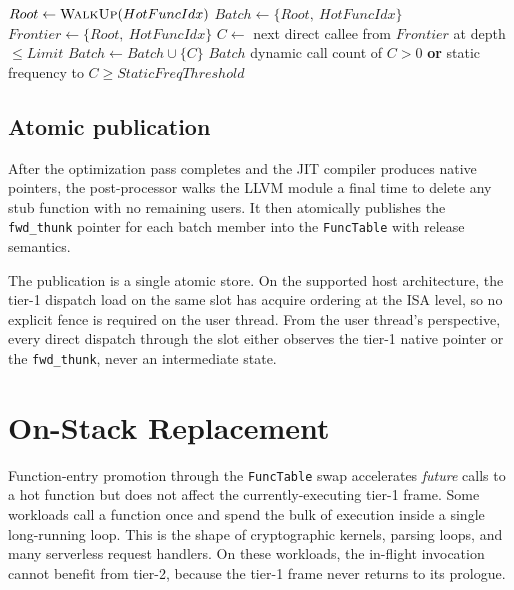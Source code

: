 \begin{algorithm}
\caption{Batch composition for a tier-up event at \emph{HotFuncIdx}.}
\label{alg:design:batch}
\begin{algorithmic}[1]
  \State $Root \gets \textsc{WalkUp}(HotFuncIdx)$ 
  \State $Batch \gets \{Root,\ HotFuncIdx\}$
  \State $Frontier \gets \{Root,\ HotFuncIdx\}$
    \State $C \gets$ next direct callee from $Frontier$ at depth $\leq Limit$
      \State $Batch \gets Batch \cup \{C\}$
    \EndIf
  \EndWhile
  \State \Return $Batch$
\EndProcedure
\State
{}
  \State \Return dynamic call count of $C > 0$ \textbf{or} static frequency to $C \geq StaticFreqThreshold$
\EndFunction
\end{algorithmic}
\end{algorithm}

\subsection{Atomic publication}
\label{sec:design:tier2:publish}

After the optimization pass completes and the JIT compiler produces native pointers, the post-processor walks the LLVM module a final time to delete any stub function with no remaining users. It then atomically publishes the \texttt{fwd\_thunk} pointer for each batch member into the \texttt{FuncTable} with release semantics.

The publication is a single atomic store. On the supported host architecture, the tier-1 dispatch load on the same slot has acquire ordering at the ISA level, so no explicit fence is required on the user thread. From the user thread's perspective, every direct dispatch through the slot either observes the tier-1 native pointer or the \texttt{fwd\_thunk}, never an intermediate state.

\section{On-Stack Replacement}
\label{sec:design:osr}

Function-entry promotion through the \texttt{FuncTable} swap accelerates \emph{future} calls to a hot function but does not affect the currently-executing tier-1 frame. Some workloads call a function once and spend the bulk of execution inside a single long-running loop. This is the shape of cryptographic kernels, parsing loops, and many serverless request handlers. On these workloads, the in-flight invocation cannot benefit from tier-2, because the tier-1 frame never returns to its prologue.

